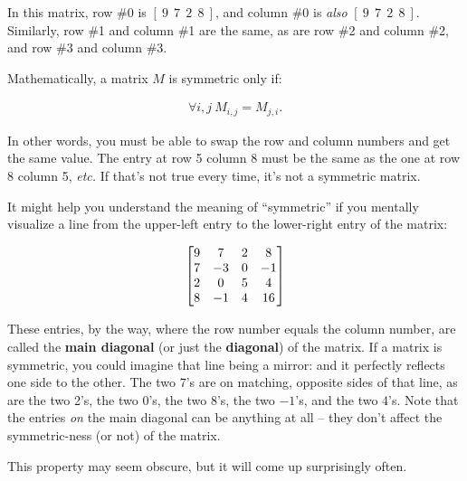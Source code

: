In this matrix, row \#0 is $[\ 9\ \ 7\ \ 2\ \ 8\ ]$, and column \#0 is
\textit{also} $[\ 9\ \ 7\ \ 2\ \ 8\ ]$. Similarly, row \#1 and column \#1 are
the same, as are row \#2 and column \#2, and row \#3 and column \#3.

\label{symmetric}

Mathematically, a matrix $M$ is symmetric only if:

\vspace{-.15in}
\begin{align*}
\forall i,j \ M_{i,j} = M_{j,i}.
\end{align*}
\vspace{-.15in}

In other words, you must be able to swap the row and column numbers and get the
same value. The entry at row 5 column 8 must be the same as the one at row 8
column 5, \textit{etc.} If that's not true every time, it's not a symmetric
matrix.

It might help you understand the meaning of ``symmetric'' if you mentally
visualize a line from the upper-left entry to the lower-right entry of the
matrix:

\vspace{-.15in}
\begin{align*}
\begin{bmatrix} \tikzmark{a}
9 & 7 & 2 & 8\\
7 & -3 & 0 & -1\\
2 & 0 & 5 & 4 \\
8 & -1 & 4 & 16 \tikzmark{b} \\
\end{bmatrix}
\end{align*}
\vspace{-.15in}


These entries, by the way, where the row number equals the column number, are
called the \textbf{main diagonal} (or just the \textbf{diagonal}) of the
matrix. If a matrix is symmetric, you could imagine that line being a mirror:
and it perfectly reflects one side to the other. The two 7's are on matching,
opposite sides of that line, as are the two 2's, the two 0's, the two 8's, the
two $-1$'s, and the two 4's. Note that the entries \textit{on} the main
diagonal can be anything at all -- they don't affect the symmetric-ness (or
not) of the matrix.

This property may seem obscure, but it will come up surprisingly often.


